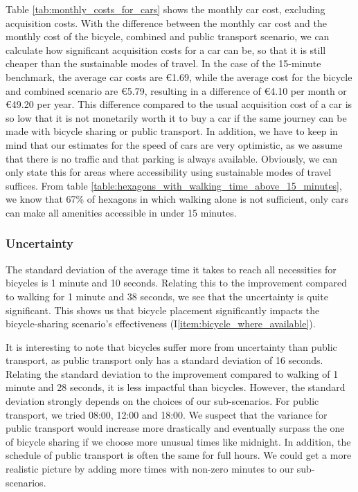 Table \ref{tab:monthly_costs_for_cars} shows the monthly car cost, excluding acquisition costs.
With the difference between the monthly car cost and the monthly cost of the bicycle, combined and public transport scenario, we can calculate how significant acquisition costs for a car can be, so that it is still cheaper than the sustainable modes of travel.
In the case of the 15-minute benchmark, the average car costs are \euro{1.69}, while the average cost for the bicycle and combined scenario are \euro{5.79}, resulting in a difference of \euro{4.10} per month or \euro{49.20} per year.
This difference compared to the usual acquisition cost of a car is so low that it is not monetarily worth it to buy a car if the same journey can be made with bicycle sharing or public transport.
In addition, we have to keep in mind that our estimates for the speed of cars are very optimistic, as we assume that there is no traffic and that parking is always available.
Obviously, we can only state this for areas where accessibility using sustainable modes of travel suffices.
From table \ref{table:hexagons_with_walking_time_above_15_minutes}, we know that 67\% of hexagons in which walking alone is not sufficient, only cars can make all amenities accessible in under 15 minutes.


\subsubsection{Uncertainty}

The standard deviation of the average time it takes to reach all necessities for bicycles is 1 minute and 10 seconds. 
Relating this to the improvement compared to walking for 1 minute and 38 seconds, we see that the uncertainty is quite significant.
This shows us that bicycle placement significantly impacts the bicycle-sharing scenario's effectiveness (I\ref{item:bicycle_where_available}).

It is interesting to note that bicycles suffer more from uncertainty than public transport, as public transport only has a standard deviation of 16 seconds.
Relating the standard deviation to the improvement compared to walking of 1 minute and 28 seconds, it is less impactful than bicycles.
However, the standard deviation strongly depends on the choices of our sub-scenarios. 
For public transport, we tried 08:00, 12:00 and 18:00.
We suspect that the variance for public transport would increase more drastically and eventually surpass the one of bicycle sharing if we choose more unusual times like midnight.
In addition, the schedule of public transport is often the same for full hours.
We could get a more realistic picture by adding more times with non-zero minutes to our sub-scenarios.

